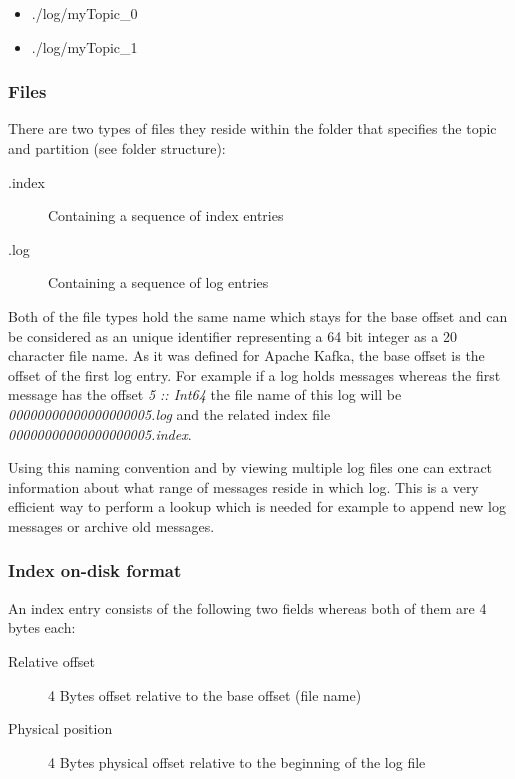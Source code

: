 \begin{itemize}
    \item ./log/myTopic\_0
    \item ./log/myTopic\_1
\end{itemize}

\subsubsection{Files}

There are two types of files they reside within the folder that specifies the
topic and partition (see folder structure):

\begin{description}
    \item[.index] Containing a sequence of index entries
    \item[.log] Containing a sequence of log entries
\end{description}

Both of the file types hold the same name which stays for the base offset and
can be considered as an unique identifier representing a 64 bit integer as a 20
character file name. As it was defined for Apache Kafka, the base offset is the
offset of the first log entry. For example if a log holds messages whereas the
first message has the offset \textit{5 :: Int64} the file name of this log will
be \textit{00000000000000000005.log} and the related index file
\textit{00000000000000000005.index}.

Using this naming convention and by
viewing multiple log files one can extract information about what range of
messages reside in which log. This is a very efficient way to perform a lookup
which is needed for example to append new log messages or archive old messages.

\subsubsection{Index on-disk format}

An index entry consists of the following two fields whereas both of them are 4 bytes each:

\begin{description}
    \item[Relative offset] 4 Bytes offset relative to the base offset (file name)
    \item[Physical position] 4 Bytes physical offset relative to the beginning of the log file
\end{description}

